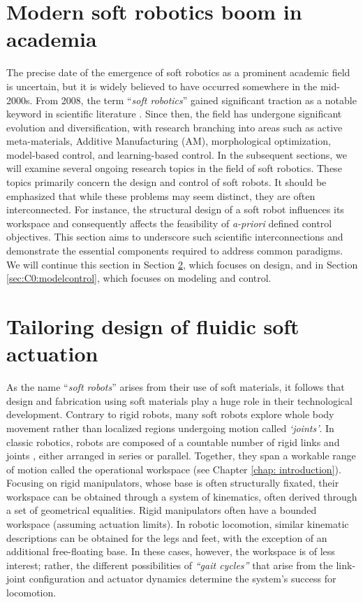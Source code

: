 \vspace{-3mm}
\section{Modern soft robotics boom in academia}
The precise date of the emergence of soft robotics as a prominent academic field is uncertain, but it is widely believed to have occurred somewhere in the mid-2000s. From 2008, the term ``\emph{soft robotics}'' gained significant traction as a notable keyword in scientific literature \cite{Bao2018Jun}. Since then, the field has undergone significant evolution and diversification, with research branching into areas such as active meta-materials, Additive Manufacturing (AM), morphological optimization, model-based control, and learning-based control. In the subsequent sections, we will examine several ongoing research topics in the field of soft robotics. These topics primarily concern the design and control of soft robots. It should be emphasized that while these problems may seem distinct, they are often interconnected. For instance, the structural design of a soft robot influences its workspace and consequently affects the feasibility of \textit{a-priori} defined control objectives. This section aims to underscore such scientific interconnections and demonstrate the essential components required to address common paradigms. We will continue this section in Section \ref{sec:C2:conventional_actuation}, which focuses on design, and in Section \ref{sec:C0:modelcontrol}, which focuses on modeling and control. \vspace{-2mm}
%
\section{Tailoring design of fluidic soft actuation}
\label{sec:C2:conventional_actuation}
As the name ``\emph{soft robots}''  arises from their use of soft materials, it follows that design and fabrication using soft materials play a huge role in their technological development. Contrary to rigid robots, many soft robots explore whole body movement rather than localized regions undergoing motion called \textit{`joints'}. In classic robotics, robots are composed of a countable number of rigid links and joints \cite{Spong2006, Murray1994, Corke2011}, either arranged in series or parallel. Together, they span a workable range of motion called the operational workspace \cite{Spong2006} (see Chapter \ref{chap: introduction}). Focusing on rigid manipulators, whose base is often structurally fixated, their workspace can be obtained through a system of kinematics, often derived through a set of geometrical equalities. Rigid manipulators often have a bounded workspace (assuming actuation limits). In robotic locomotion, similar kinematic descriptions can be obtained for the legs and feet, with the exception of an additional free-floating base. In these cases, however, the workspace is of less interest; rather, the different possibilities of \textit{``gait cycles''} that arise from the link-joint configuration and actuator dynamics determine the system's success for locomotion.

